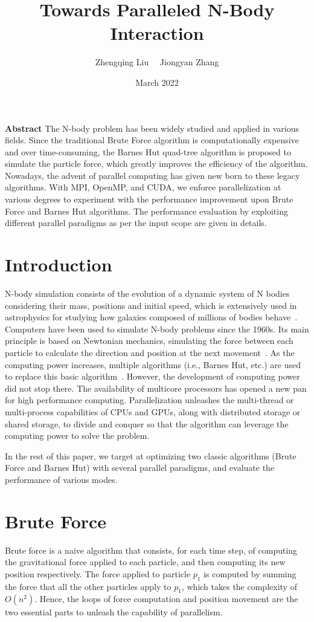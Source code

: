 \documentclass{scrartcl}
\title{Towards Paralleled N-Body Interaction}
\author{Zhengqing Liu  ~~Jiongyan Zhang}
\date{March 2022}
\begin{document}
\maketitle

\noindent \textbf{Abstract} The N-body problem has been widely studied and applied in various fields. Since the traditional Brute Force algorithm is computationally expensive and over time-consuming, the Barnes Hut quad-tree algorithm is proposed to simulate the particle force, which greatly improves the efficiency of the algorithm. Nowadays, the advent of parallel computing has given new born to these legacy algorithms. With MPI, OpenMP, and CUDA, we enforce parallelization at various degrees to experiment with the performance improvement upon Brute Force and Barnes Hut algorithms. The performance evaluation by exploiting different parallel paradigms as per the input scope are given in details.


\section{Introduction}
\noindent
N-body simulation consists of the evolution of a dynamic system of N bodies considering their mass, positions and initial speed, which is extensively used in astrophysics for studying how galaxies composed of millions of bodies behave~\cite{wiki}. 
Computers have been used to simulate N-body problems since the 1960s. 
Its main principle is based on Newtonian mechanics, simulating the force between each particle to calculate the direction and position at the next movement~\cite{aarseth2003gravitational}. 
As the computing power increases, multiple algorithms (i.e., Barnes Hut, etc.) are used to replace this basic algorithm~\cite{trenti2008n}. 
However, the development of computing power did not stop there. 
The availability of multicore processors has opened a new pan for high performance computing.
Parallelization unleashes the multi-thread or multi-process capabilities of CPUs and GPUs, along with distributed storage or shared storage, to divide and conquer so that the algorithm can leverage the computing power to solve the problem.

\noindent In the rest of this paper, we target at optimizing two classic algorithms (Brute Force and Barnes Hut) with several parallel paradigms, and evaluate the performance of various modes.

\section{Brute Force}
\noindent
Brute force is a naive algorithm that consists, for each time step, of computing the gravitational force applied to each particle, and then computing its new position respectively. 
The force applied to particle $p_1$ is computed by summing the force that all the other particles apply to $p_1$, which takes the complexity of $O(n^2)$.
Hence, the loops of force computation and position movement are the two essential parts to unleash the capability of parallelism.
\end{document}
